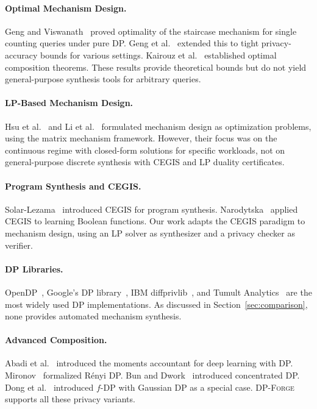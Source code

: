 \documentclass[11pt,a4paper]{article}
\newcommand{\dpforge}{\textsc{DP-Forge}}
\begin{document}
\paragraph{Optimal Mechanism Design.}
Geng and Viswanath~\cite{geng2014optimal} proved optimality of the staircase
mechanism for single counting queries under pure DP.  Geng et al.~\cite{geng2020tight}
extended this to tight privacy-accuracy bounds for various settings.
Kairouz et al.~\cite{kairouz2015composition} established optimal composition
theorems.  These results provide theoretical bounds but do not yield
general-purpose synthesis tools for arbitrary queries.

\paragraph{LP-Based Mechanism Design.}
Hsu et al.~\cite{hsu2014differential} and Li et al.~\cite{li2015matrix}
formulated mechanism design as optimization problems, using the matrix mechanism
framework.  However, their focus was on the continuous regime with closed-form
solutions for specific workloads, not on general-purpose discrete synthesis
with CEGIS and LP duality certificates.

\paragraph{Program Synthesis and CEGIS.}
Solar-Lezama~\cite{solar2006combinatorial} introduced CEGIS for program synthesis.
Narodytska~\cite{narodytska2019learning} applied CEGIS to learning Boolean
functions.  Our work adapts the CEGIS paradigm to mechanism design, using an
LP solver as synthesizer and a privacy checker as verifier.

\paragraph{DP Libraries.}
OpenDP~\cite{opendp2023}, Google's DP library~\cite{google2019dp},
IBM diffprivlib~\cite{holohan2019diffprivlib}, and Tumult Analytics~\cite{tumult2022}
are the most widely used DP implementations.  As discussed in
Section~\ref{sec:comparison}, none provides automated mechanism synthesis.

\paragraph{Advanced Composition.}
Abadi et al.~\cite{abadi2016deep} introduced the moments accountant for
deep learning with DP.  Mironov~\cite{mironov2017renyi} formalized R\'enyi DP.
Bun and Dwork~\cite{bun2016concentrated} introduced concentrated DP.
Dong et al.~\cite{dong2022gaussian} introduced $f$-DP with Gaussian DP as
a special case.  \dpforge{} supports all these privacy variants.
\end{document}
